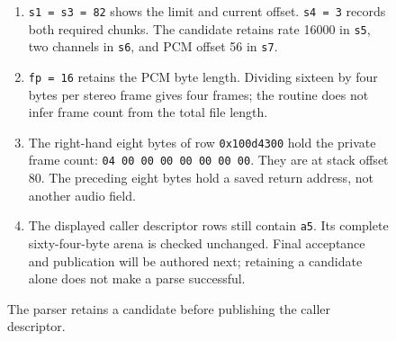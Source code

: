 \begin{figure}[htbp]
\begin{minipage}{\linewidth}
\begin{enumerate}
      \item \texttt{s1 = s3 = 82} shows the limit and current offset. \texttt{s4 = 3} records both required chunks. The candidate retains rate 16000 in \texttt{s5}, two channels in \texttt{s6}, and PCM offset 56 in \texttt{s7}.
      \item \texttt{fp = 16} retains the PCM byte length. Dividing sixteen by four bytes per stereo frame gives four frames; the routine does not infer frame count from the total file length.
      \item The right-hand eight bytes of row \texttt{0x100d4300} hold the private frame count: \texttt{04 00 00 00 00 00 00 00}. They are at stack offset 80. The preceding eight bytes hold a saved return address, not another audio field.
      \item The displayed caller descriptor rows still contain \texttt{a5}. Its complete sixty-four-byte arena is checked unchanged. Final acceptance and publication will be authored next; retaining a candidate alone does not make a parse successful.
    \end{enumerate}
  \end{minipage}
  \caption{The parser retains a candidate before publishing the caller descriptor.}
  \label{capture:031-pcm-wav-f03}
  \label{pcm-wav-f03}
\end{figure}
\par
